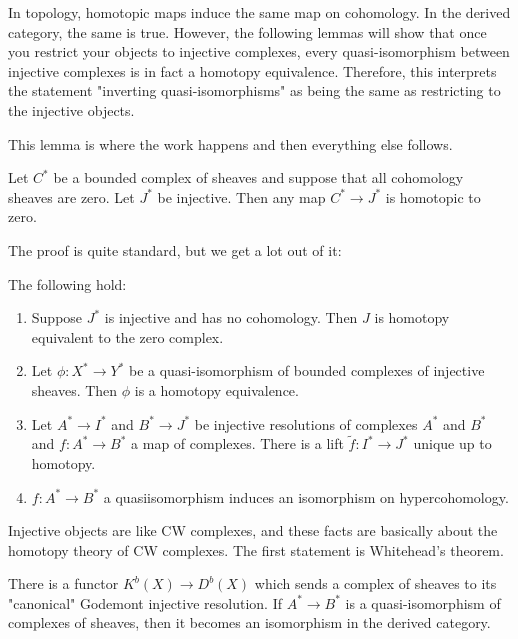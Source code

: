 \documentclass[12pt]{article}
\begin{document}
\begin{remark}
    In topology, homotopic maps induce the same map on cohomology. In the derived category, the same is true.
    However, the following lemmas will show that once you restrict your objects to injective complexes,
    every quasi-isomorphism between injective complexes is in fact a homotopy equivalence.
    Therefore, this interprets the statement "inverting quasi-isomorphisms" as being the same as
    restricting to the injective objects.
\end{remark}

This lemma is where the work happens and then everything else follows.
\begin{lemma}
    Let $C^*$ be a bounded complex of sheaves and suppose that all cohomology sheaves are zero.
    Let $J^*$ be injective. Then any map $C^*\to J^*$ is homotopic to zero.
\end{lemma}
The proof is quite standard, but we get a lot out of it:

\begin{corollary}
    The following hold:
    \begin{enumerate}
        \item Suppose $J^*$ is injective and has no cohomology. Then $J$
              is homotopy equivalent to the zero complex.
        \item Let $\phi:X^*\to Y^*$ be a quasi-isomorphism of bounded complexes of injective sheaves.
              Then $\phi$ is a homotopy equivalence.
        \item Let $A^*\to I^*$ and $B^*\to J^*$ be injective resolutions of complexes $A^*$
              and $B^*$ and $f:A^*\to B^*$ a map of complexes. There is a lift
              $\tilde f:I^*\to J^*$ unique up to homotopy.
        \item $f:A^*\to B^*$ a quasiisomorphism induces an isomorphism on hypercohomology.
    \end{enumerate}
    \end{corollary}

    \begin{remark}
        Injective objects are like CW complexes, and these facts are basically about
        the homotopy theory of CW complexes. The first statement is Whitehead's theorem.
    \end{remark}
    There is a functor $K^b(X) \to D^b(X)$ which sends a complex of sheaves
    to its "canonical" Godemont injective resolution. If $A^* \to B^*$
    is a quasi-isomorphism of complexes of sheaves, then it becomes
    an isomorphism in the derived category.
\end{document}
